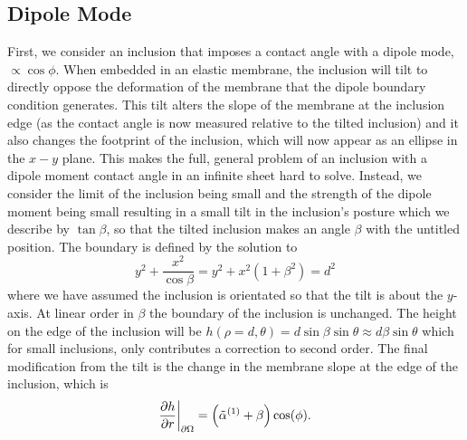 \subsection{Dipole Mode}
First, we consider an inclusion that imposes a contact angle with a dipole mode, $\propto \cos\phi$. When embedded in an elastic membrane, the inclusion will tilt to directly oppose the deformation of the membrane that the dipole boundary condition generates. This tilt alters the slope of the membrane at the inclusion edge (as the contact angle is now measured relative to the tilted inclusion) and it also changes the footprint of the inclusion, which will now appear as an ellipse in the $x-y$ plane. This makes the full, general problem of an inclusion with a dipole moment contact angle in an infinite sheet hard to solve. Instead, we consider the limit of the inclusion being small and the strength of the dipole moment being small resulting in a small tilt in the inclusion's posture which we describe by $\tan{\beta}$, so that the tilted inclusion makes an angle $\beta$ with the untitled position. The boundary is defined by the solution to 
\begin{equation}
    y^2 + \frac{x^2}{\cos\beta} = y^2 + x^2(1+\beta^2) = d^2
\end{equation}
where we have assumed the inclusion is orientated so that the tilt is about the $y$-axis. At linear order in $\beta$ the boundary of the inclusion is unchanged. The height on the edge of the inclusion will be $h(\rho=d, \theta)  = d \sin\beta \sin\theta \approx d \beta \sin\theta$ which for small inclusions, only contributes a correction to second order. The final modification from the tilt is the change in the membrane slope at the edge of the inclusion, which is
\begin{equation}
    \frac{\partial h}{\partial r}\bigg\rvert_{\partial\Omega} = \left(\Tilde{\alpha}^{(1)}+\beta\right)\cos(\phi).
\end{equation}

